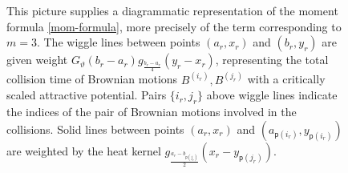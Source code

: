 \documentclass[a4paper,reqno,11pt]{amsart}
\numberwithin{equation}{section}
\theoremstyle{mytheorem}
\newcommand{\gt}{\vartheta}
\newcommand\sfp{\mathsf p}
\begin{document}
{\begin{figure}
    \caption{This picture supplies a diagrammatic representation of the moment formula \eqref{mom-formula}, 
    more precisely of the term corresponding to $m=3$. The wiggle lines between points $(a_r,x_r)$ and 
    $(b_r,y_r)$ are given weight $ G_\gt(b_r-a_r) g_{\frac{b_r-a_r}{4}}(y_r-x_r)  $, representing the 
    total collision time of Brownian motions $B^{(i_r)} , B^{(j_r)}$ with a critically scaled attractive potential. 
    Pairs $\{i_r,j_r\}$ above wiggle lines indicate the indices of the pair of Brownian motions involved in the
    collisions.
    Solid lines between points $(a_r, x_r)$ and $(a_{\sfp(i_r)}, y_{\sfp(i_r)})$  are weighted by the heat kernel 
   $g_{\frac{a_{r}-b_{\sfp(j_{r})}}{2}} (x_{r}- y_{\sfp(j_{r})})$. 
    }
    \label{fig:CK2}
\end{figure}

\begin{figure}
\end{figure}}
\end{document}
